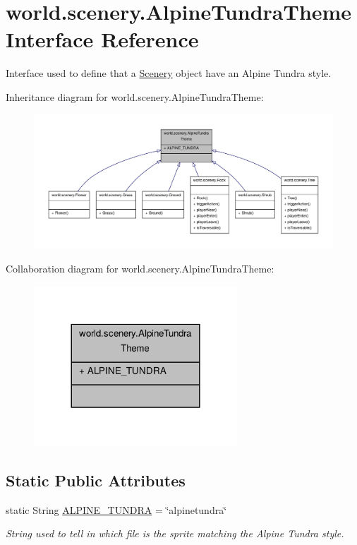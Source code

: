 \hypertarget{a00002}{\section{world.\-scenery.\-Alpine\-Tundra\-Theme Interface Reference}
\label{a00002}
}


Interface used to define that a \hyperlink{a00024}{Scenery} object have an Alpine Tundra style.  




Inheritance diagram for world.\-scenery.\-Alpine\-Tundra\-Theme\-:
\nopagebreak
\begin{figure}[H]
\begin{center}
\leavevmode
\includegraphics[width=350pt]{a00152}
\end{center}
\end{figure}


Collaboration diagram for world.\-scenery.\-Alpine\-Tundra\-Theme\-:
\nopagebreak
\begin{figure}[H]
\begin{center}
\leavevmode
\includegraphics[width=216pt]{a00153}
\end{center}
\end{figure}
\subsection*{Static Public Attributes}
\begin{DoxyCompactItemize}
\item 
static String \hyperlink{a00002_ad3c9b18e312ff348661fc1a42f28f7b6}{A\-L\-P\-I\-N\-E\-\_\-\-T\-U\-N\-D\-R\-A} = \char`\"{}alpinetundra\char`\"{}
\begin{DoxyCompactList}\small\item\em String used to tell in which file is the sprite matching the Alpine Tundra style. \end{DoxyCompactList}\end{DoxyCompactItemize}



